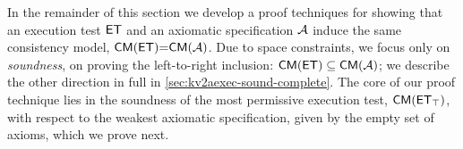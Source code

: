 In the remainder of this section we develop a proof techniques for showing  
that an execution test $\mathsf{ET}$ and an axiomatic specification $\mathcal{A}$ induce the same 
consistency model, \ie$\CMs(\ET) {=} \CMs(\Ax)$. 
Due to space constraints, we focus only on \emph{soundness}, \ie on proving the left-to-right inclusion: $\CMs(\ET) \subseteq \CMs(\Ax)$; 
we describe the other direction in full in \cref{sec:kv2aexec-sound-complete}. 
The core of our proof technique lies in the soundness of the most permissive execution 
test, $\CMs(\ET_{\top})$, with respect to the weakest axiomatic specification, given by 
the empty set of axioms, which we prove next.
%

%

